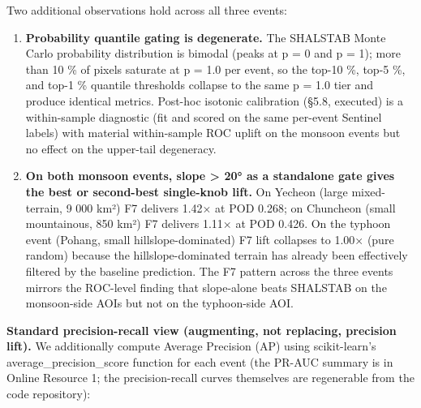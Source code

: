 \documentclass[11pt,a4paper]{article}
\providecommand{\tightlist}{%
  \setlength{\itemsep}{0pt}\setlength{\parskip}{0pt}}
\begin{document}
Two additional observations hold across all three events:

\begin{enumerate}
\def\labelenumi{\arabic{enumi}.}
\tightlist
\item
  \textbf{Probability quantile gating is degenerate.} The SHALSTAB Monte Carlo probability distribution is bimodal (peaks at p = 0 and p = 1); more than 10 \% of pixels saturate at p = 1.0 per event, so the top-10 \%, top-5 \%, and top-1 \% quantile thresholds collapse to the same p = 1.0 tier and produce identical metrics. Post-hoc isotonic calibration (§5.8, executed) is a within-sample diagnostic (fit and scored on the same per-event Sentinel labels) with material within-sample ROC uplift on the monsoon events but no effect on the upper-tail degeneracy.
\item
  \textbf{On both monsoon events, slope \textgreater{} 20° as a standalone gate gives the best or second-best single-knob lift.} On Yecheon (large mixed-terrain, 9 000 km²) F7 delivers 1.42× at POD 0.268; on Chuncheon (small mountainous, 850 km²) F7 delivers 1.11× at POD 0.426. On the typhoon event (Pohang, small hillslope-dominated) F7 lift collapses to 1.00× (pure random) because the hillslope-dominated terrain has already been effectively filtered by the baseline prediction. The F7 pattern across the three events mirrors the ROC-level finding that slope-alone beats SHALSTAB on the monsoon-side AOIs but not on the typhoon-side AOI.
\end{enumerate}

\textbf{Standard precision-recall view (augmenting, not replacing, precision lift).} We additionally compute Average Precision (AP) using scikit-learn's average\_precision\_score function for each event (the PR-AUC summary is in Online Resource 1; the precision-recall curves themselves are regenerable from the code repository):
\end{document}
